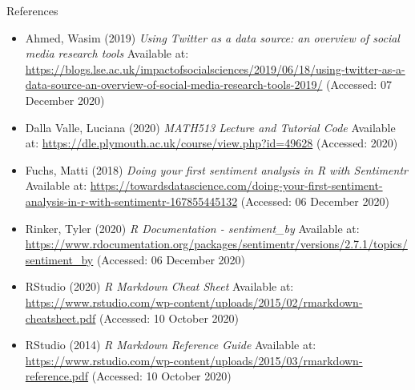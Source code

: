 \documentclass[
  ignorenonframetext,
]{beamer}
\begin{document}
\begin{frame}{References}
\protect\hypertarget{references}{}
\begin{itemize}
\item
  Ahmed, Wasim (2019) \emph{Using Twitter as a data source: an overview
  of social media research tools} Available at:
  \url{https://blogs.lse.ac.uk/impactofsocialsciences/2019/06/18/using-twitter-as-a-data-source-an-overview-of-social-media-research-tools-2019/}
  (Accessed: 07 December 2020)
\item
  Dalla Valle, Luciana (2020) \emph{MATH513 Lecture and Tutorial Code}
  Available at:
  \url{https://dle.plymouth.ac.uk/course/view.php?id=49628} (Accessed:
  2020)
\item
  Fuchs, Matti (2018) \emph{Doing your first sentiment analysis in R
  with Sentimentr} Available at:
  \url{https://towardsdatascience.com/doing-your-first-sentiment-analysis-in-r-with-sentimentr-167855445132}
  (Accessed: 06 December 2020)
\item
  Rinker, Tyler (2020) \emph{R Documentation - sentiment\_by} Available
  at:
  \url{https://www.rdocumentation.org/packages/sentimentr/versions/2.7.1/topics/sentiment_by}
  (Accessed: 06 December 2020)
\item
  RStudio (2020) \emph{R Markdown Cheat Sheet} Available at:
  \url{https://www.rstudio.com/wp-content/uploads/2015/02/rmarkdown-cheatsheet.pdf}
  (Accessed: 10 October 2020)
\item
  RStudio (2014) \emph{R Markdown Reference Guide} Available at:
  \url{https://www.rstudio.com/wp-content/uploads/2015/03/rmarkdown-reference.pdf}
  (Accessed: 10 October 2020)
\end{itemize}
\end{frame}
\end{document}
